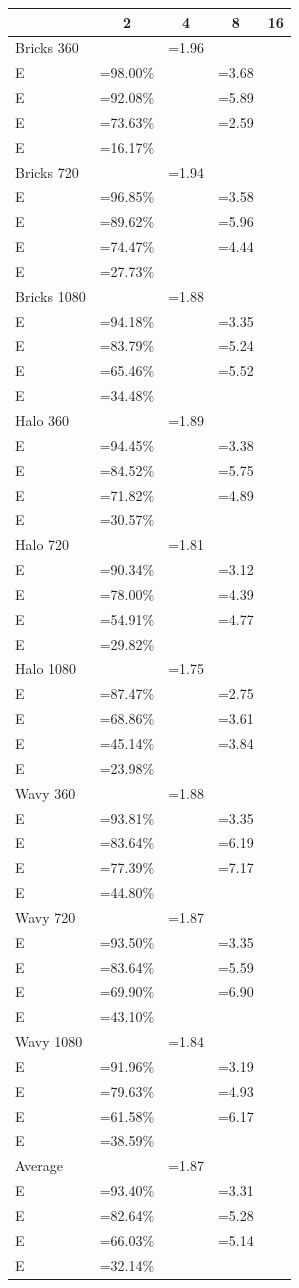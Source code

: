 \newcommand{\SE}[2]{\footnotesize \(\begin{aligned}S&=#1\times \\[-5pt] E&=#2\% \end{aligned}\)}
\begin{tabular}{l|c c c c}
&2&4&8&16\\
\hline
Bricks 360&\SE{1.96}{98.00}&\SE{3.68}{92.08}&\SE{5.89}{73.63}&\SE{2.59}{16.17}\\
Bricks 720&\SE{1.94}{96.85}&\SE{3.58}{89.62}&\SE{5.96}{74.47}&\SE{4.44}{27.73}\\
Bricks 1080&\SE{1.88}{94.18}&\SE{3.35}{83.79}&\SE{5.24}{65.46}&\SE{5.52}{34.48}\\
Halo 360&\SE{1.89}{94.45}&\SE{3.38}{84.52}&\SE{5.75}{71.82}&\SE{4.89}{30.57}\\
Halo 720&\SE{1.81}{90.34}&\SE{3.12}{78.00}&\SE{4.39}{54.91}&\SE{4.77}{29.82}\\
Halo 1080&\SE{1.75}{87.47}&\SE{2.75}{68.86}&\SE{3.61}{45.14}&\SE{3.84}{23.98}\\
Wavy 360&\SE{1.88}{93.81}&\SE{3.35}{83.64}&\SE{6.19}{77.39}&\SE{7.17}{44.80}\\
Wavy 720&\SE{1.87}{93.50}&\SE{3.35}{83.64}&\SE{5.59}{69.90}&\SE{6.90}{43.10}\\
Wavy 1080&\SE{1.84}{91.96}&\SE{3.19}{79.63}&\SE{4.93}{61.58}&\SE{6.17}{38.59}\\
Average&\SE{1.87}{93.40}&\SE{3.31}{82.64}&\SE{5.28}{66.03}&\SE{5.14}{32.14}\\
\end{tabular}